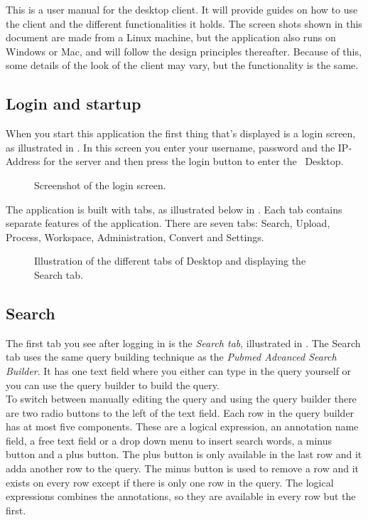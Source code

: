 This is a user manual for the desktop client. It will provide guides on how to 
use the client and the different functionalities it holds. The screen shots 
shown in this document are made from a Linux machine, but the application 
also runs on Windows or Mac, and will follow the design principles thereafter. 
Because of this, some details of the look of the client may vary, but the functionality is the same.

\subsection{Login and startup}
When you start this application the first thing that's displayed is a login screen, as illustrated in . In this screen you enter your username, password and the IP-Address for the server and then press the login button to enter the \appName\ Desktop.

\begin{figure}[h!]
	\caption{Screenshot of the login screen.}
	\label{fig:des_login-pic}
\end{figure}
The application is built with tabs, as illustrated below in . Each tab contains separate features of the application. There are seven tabs: Search, Upload, Process, Workspace, Administration, Convert and Settings.
\begin{figure}[htb]
	\caption{Illustration of the different tabs of \appName Desktop and displaying the Search tab.}
	\label{fig:des_tabs-view}
\end{figure}
\FloatBarrier

\subsection{Search}
The first tab you see after logging in is the \textit{Search tab}, illustrated in . The Search tab uses the same query building technique as the \textit{Pubmed Advanced Search Builder}\cite{des_3}. It has one text field where you either can type in the query yourself or you can use the query builder to build the query. \\

To switch between manually editing the query and using the query builder there are two radio buttons to the left of the text field. Each row in the query builder has at most five components. These are a logical expression, an annotation name field, a free text field or a drop down menu to insert search words, a minus button and a plus button. The plus button is only available in the last row and it adda another row to the query. The minus button is used to remove a row and it exists on every row except if there is only one row in the query. The logical expressions combines the annotations, so they are available in every row but the first. \\

